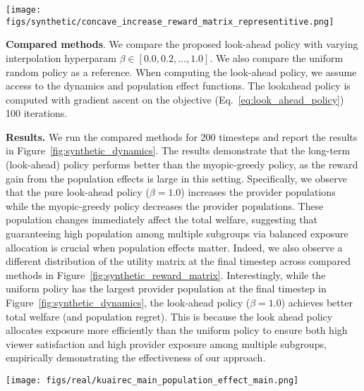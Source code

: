\begin{figure*}[t]
\centering
\texttt{[image: figs/synthetic/concave\_increase\_reward\_matrix\_representitive.png]}
    \caption{\textbf{Comparing the utility matrix of the myopic ($\beta=0.0$), long-term ($\beta=1.0$), and uniform random policies at the final timestep and the initial utility matrix.} For the initial utility matrix, we use the one with a small initial population. 
  } 
  \label{fig:synthetic_reward_matrix}
\end{figure*}

\textbf{Compared methods}. \;
We compare the proposed look-ahead policy with varying interpolation hyperparam $\beta \in [0.0, 0.2, \ldots, 1.0]$.
We also compare the uniform random policy as a reference. When computing the look-ahead policy, we assume access to the dynamics and population effect functions.
The lookahead policy is computed with gradient ascent on the objective (Eq.~\eqref{eq:look_ahead_policy}) 100 iterations. 

\textbf{Results. } \;
We run the compared methods for 200 timesteps and report the results in Figure~\ref{fig:synthetic_dynamics}. 
The results demonstrate that the long-term (look-ahead) policy performs better than the myopic-greedy policy, as the reward gain from the population effects is large
in this setting. 
Specifically, 
we observe that the pure look-ahead policy ($\beta=1.0$) increases the provider populations while the myopic-greedy policy decreases the provider populations. 
These population changes immediately affect the total welfare, 
suggesting that guaranteeing high population among multiple subgroups via balanced exposure allocation is crucial when population effects matter. 
Indeed, we also observe a different distribution of the utility matrix at the final timestep across compared methods in Figure~\ref{fig:synthetic_reward_matrix}. 
Interestingly, while the uniform policy has the largest provider population at the final timestep in Figure~\ref{fig:synthetic_dynamics}, the look-ahead policy ($\beta=1.0$) achieves better total welfare (and population regret). This is because the look ahead policy allocates exposure more efficiently than the uniform policy to ensure both high viewer satisfaction and high provider exposure among multiple subgroups, empirically demonstrating the effectiveness of our approach.

\begin{figure*}[t]
\centering
\texttt{[image: figs/real/kuairec\_main\_population\_effect\_main.png]}
    \caption{\textbf{Visualization of the (true) population effects in the real-world experiment.} The population effects are based on the spline function~\citep{reinsch1967smoothing} fitted on the empirical population effect (dotted points) observed in the KuaiRec~\citep{gao2022kuairec} dataset. Figures~\ref{fig:estimation_population_effect} and \ref{fig:estimation_population_dynamics} in the Appendix also report the population effects and dynamics learned by the long-term policy, following Section~\ref{sec:dyanmics_estimation}.}
  \label{fig:real_population_effect}
\end{figure*}

